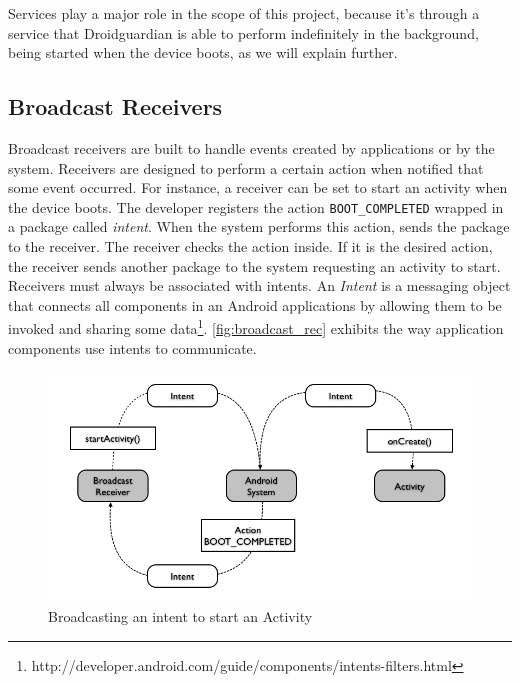 Services play a major role in the scope of this project, because it's through a service that Droidguardian is able to perform indefinitely in the background, being started when the device boots, as we will explain further.

\subsection{Broadcast Receivers}

Broadcast receivers are built to handle events created by applications or by the system. Receivers are designed to perform a certain action when notified that some event occurred. For instance, a receiver can be set to start an activity when the device boots. The developer registers the action \texttt{BOOT\_COMPLETED} wrapped in a package called \textit{intent}. When the system performs this action, sends the package to the receiver. The receiver checks the action inside. If it is the desired action, the receiver sends another package to the system requesting an activity to start. Receivers must always be associated with intents. An \textit{Intent} is a messaging object that connects all components in an Android applications by allowing them to be invoked and sharing some data\footnote{http://developer.android.com/guide/components/intents-filters.html}. \autoref{fig:broadcast_rec} exhibits the way application components use intents to communicate.

\begin{figure}[h]
 \begin{center}
 \includegraphics[scale=0.5]{figures/broadcast_receiver.png}
 \end{center}
 \caption{Broadcasting an intent to start an Activity}
 \label{fig:broadcast_rec}
\end{figure}


